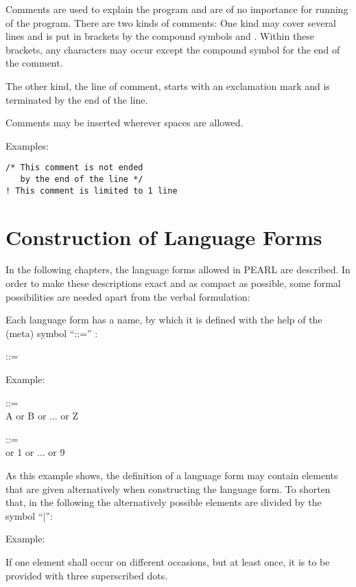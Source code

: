 Comments are used to explain the program and are of no importance for
running of the program. There are two kinds of comments: One kind may
cover several lines and is put in brackets by the compound symbols \code{/*}
and \code{*/}. Within these brackets, any characters may occur except the
compound symbol \code{*/} for the end of the comment.

The other kind, the line of comment, starts with an exclamation
mark \code{!} and is terminated by the end of the line.

Comments may be inserted wherever spaces are allowed.

Examples:

\begin{lstlisting}
/* This comment is not ended
   by the end of the line */
! This comment is limited to 1 line
\end{lstlisting}

\section{Construction of Language Forms}  %

In the following chapters, the language forms allowed in PEARL are
described.  In order to make these descriptions exact and as compact as
possible, some formal possibilities are needed apart from the verbal
formulation:

Each language form has a name, by which it is defined with the help of
the (meta) symbol ``::='' :

 ::=\\
\x {}

Example:

 ::=\\
\x A or B or ... or Z

 ::=\\
 or 1 or ... or 9

As this example shows, the definition of a language form may contain
elements that are given alternatively when constructing the language
form. To shorten that, in the following the alternatively possible
elements are divided by the symbol ``$\mid$'':

Example:

\begin{grammarframe}


\end{grammarframe}

If one element shall occur on different occasions, but at least once, it
is to be provided with three superscribed dots.

